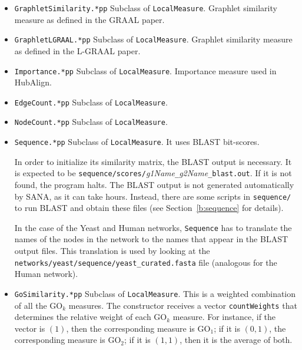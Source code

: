 \documentclass[]{article}
\begin{document}
\begin{itemize}
\item \texttt{GraphletSimilarity.*pp} Subclass of \texttt{LocalMeasure}. Graphlet similarity measure as defined in the GRAAL paper.

\item \texttt{GraphletLGRAAL.*pp} Subclass of \texttt{LocalMeasure}. Graphlet similarity measure as defined in the L-GRAAL paper.

\item \texttt{Importance.*pp} Subclass of \texttt{LocalMeasure}. Importance measure used in HubAlign.

\item \texttt{EdgeCount.*pp} Subclass of \texttt{LocalMeasure}.

\item \texttt{NodeCount.*pp} Subclass of \texttt{LocalMeasure}.

\item \texttt{Sequence.*pp} Subclass of \texttt{LocalMeasure}. It uses BLAST bit-scores.

In order to initialize its similarity matrix, the BLAST output is necessary. It is expected to be \texttt{sequence/scores/}\textit{g1Name}\texttt{\_}\textit{g2Name}\texttt{\_blast.out}. If it is not found, the program halts. The BLAST output is not generated automatically by SANA, as it can take hours. Instead, there are some scripts in \texttt{sequence/} to run BLAST and obtain these files (see Section~\ref{b:sequence} for details).

In the case of the Yeast and Human networks, \texttt{Sequence} has to translate the names of the nodes in the network to the names that appear in the BLAST output files. This translation is used by looking at the \texttt{networks/yeast/sequence/yeast\_curated.fasta} file (analogous for the Human network).

\item \texttt{GoSimilarity.*pp} Subclass of \texttt{LocalMeasure}. This is a weighted combination of all the $\mbox{GO}_k$ measures. The constructor receives a vector \texttt{countWeights} that determines the relative weight of each $\mbox{GO}_k$ measure. For instance, if the vector is $(1)$, then the corresponding measure is $\mbox{GO}_1$; if it is $(0,1)$, the corresponding measure is $\mbox{GO}_2$; if it is $(1,1)$, then it is the average of both.


\end{itemize}
\end{document}
